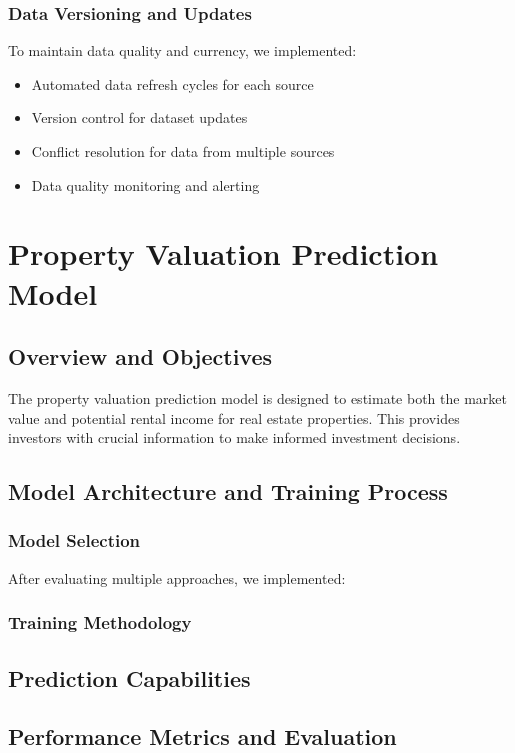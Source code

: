 \subsubsection{Data Versioning and Updates}
To maintain data quality and currency, we implemented:
\begin{itemize}
    \item Automated data refresh cycles for each source
    \item Version control for dataset updates
    \item Conflict resolution for data from multiple sources
    \item Data quality monitoring and alerting
\end{itemize}

\section{Property Valuation Prediction Model}
\subsection{Overview and Objectives}
The property valuation prediction model is designed to estimate both the market value and potential rental income for real estate properties. This provides investors with crucial information to make informed investment decisions.

\subsection{Model Architecture and Training Process}
\subsubsection{Model Selection}
After evaluating multiple approaches, we implemented:


\subsubsection{Training Methodology}


\subsection{Prediction Capabilities}


\subsection{Performance Metrics and Evaluation}


